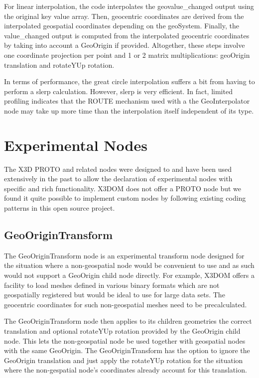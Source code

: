 \documentclass{acmsiggraph}                     %
\begin{document}
For linear interpolation, the code interpolates the geovalue\_changed output using the original key
value array. Then, geocentric coordinates are derived from the interpolated geospatial coordinates
depending on the geoSystem. Finally, the  value\_changed output is computed from the interpolated
geocentric coordinates by taking into account a GeoOrigin if provided. Altogether, these steps
involve one coordinate projection per point and 1 or 2 matrix multiplications: geoOrigin translation
and rotateYUp rotation.

In terms of performance, the great circle interpolation suffers a bit from having to perform a slerp
calculation. However, slerp is very efficient. In fact, limited profiling indicates that the ROUTE
mechanism used with a the GeoInterpolator node may take up more time than the interpolation itself
independent of its type.

\section{Experimental Nodes}

The X3D PROTO and related nodes were designed to and have been used extensively in the past to allow the declaration of experimental nodes with specific and rich functionality. X3DOM does not offer a PROTO node but we found it quite possible to implement custom nodes by following existing coding patterns in this open source project.

\subsection{GeoOriginTransform}

The GeoOriginTransform node is an experimental transform node designed for the situation where a non-geospatial node would be convenient to use and as such would not support a GeoOrigin child node directly. For example, X3DOM offers a facility to load meshes defined in various binary formats which are not geospatially registered but would be ideal to use for large data sets. The geocentric coordinates for such non-geospatial meshes need to be precalculated.

The GeoOriginTransform node then applies to its children geometries the correct translation and optional rotateYUp rotation provided by the GeoOrigin child node. This lets the non-geospatial node be used together with geospatial nodes with the same GeoOrigin. The GeoOriginTransform has the option to ignore the GeoOrigin translation and just apply the rotateYUp rotation for the situation where the non-gespatial node's coordinates already account for this translation.
\end{document}
